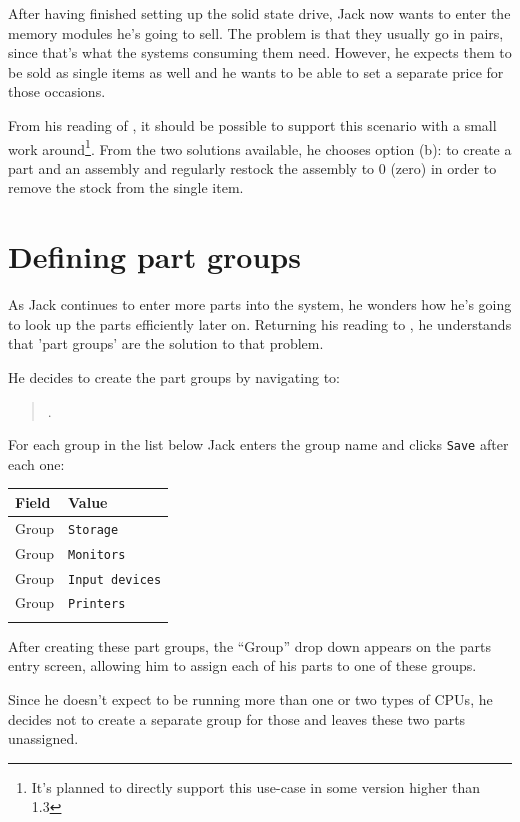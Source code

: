 After having finished setting up the solid state drive, Jack now wants to enter
the memory modules he's going to sell. The problem is that they usually go in pairs,
since that's what the systems consuming them need. However, he expects them to be sold
as single items as well and he wants to be able to set a separate price for those occasions.

From his reading of , it should be
possible to support this scenario with a small work around\footnote{It's planned to directly
support this use-case in some version higher than 1.3}. From the two solutions available,
he chooses option (b): to create a part and an assembly and regularly restock the assembly
to 0 (zero) in order to remove the stock from the single item.

\section{Defining part groups}
\label{sec-stock-part-groups}

As Jack continues to enter more parts into the system, he wonders how he's going to
look up the parts efficiently later on. Returning his reading to ,
he understands that 'part groups'  are the solution to that problem. 

He decides to create
the part groups by navigating to:
\begin{quote}
.
\end{quote}
For each group in the list below Jack enters the group name and clicks \texttt{Save} after each one:

\begin{tabular}{ll}
Field & Value \\ \hline
Group & \texttt{Storage}\\
Group & \texttt{Monitors}\\
Group & \texttt{Input devices}\\
Group & \texttt{Printers}\\
\\
\end{tabular}

After creating these part groups, the ``Group'' drop down appears on the parts entry screen,
allowing him to assign each of his parts to one of these groups.

Since he doesn't expect to be running more than one or two types of CPUs, he decides
not to create a separate group for those and leaves these two parts unassigned.

